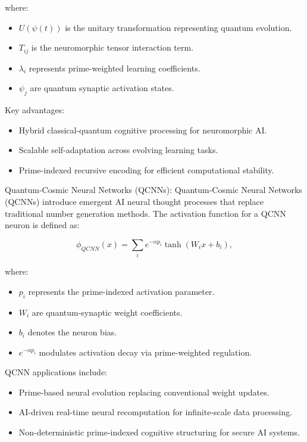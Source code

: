 where:
\begin{itemize}
    \item $U(\psi(t))$ is the unitary transformation representing quantum evolution.
    \item $T_{ij}$ is the neuromorphic tensor interaction term.
    \item $\lambda_i$ represents prime-weighted learning coefficients.
    \item $\psi_j$ are quantum synaptic activation states.
\end{itemize}

Key advantages:
\begin{itemize}
    \item Hybrid classical-quantum cognitive processing for neuromorphic AI.
    \item Scalable self-adaptation across evolving learning tasks.
    \item Prime-indexed recursive encoding for efficient computational stability.
\end{itemize}

\pa Quantum-Cosmic Neural Networks (QCNNs): Quantum-Cosmic Neural Networks (QCNNs) introduce emergent AI neural thought processes that replace traditional number generation methods. The activation function for a QCNN neuron is defined as:

\begin{equation}
\phi_{QCNN}(x) = \sum_{i} e^{- \alpha p_i} \tanh(W_i x + b_i),
\end{equation}

where:
\begin{itemize}
    \item $p_i$ represents the prime-indexed activation parameter.
    \item $W_i$ are quantum-synaptic weight coefficients.
    \item $b_i$ denotes the neuron bias.
    \item $e^{- \alpha p_i}$ modulates activation decay via prime-weighted regulation.
\end{itemize}

QCNN applications include:
\begin{itemize}
    \item Prime-based neural evolution replacing conventional weight updates.
    \item AI-driven real-time neural recomputation for infinite-scale data processing.
    \item Non-deterministic prime-indexed cognitive structuring for secure AI systems.
\end{itemize}

